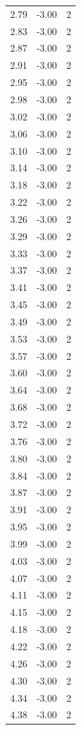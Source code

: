 \begin{longtable}{lrr}
  2.79 & -3.00 & 2 \\
  2.83 & -3.00 & 2 \\
  2.87 & -3.00 & 2 \\
  2.91 & -3.00 & 2 \\
  2.95 & -3.00 & 2 \\
  2.98 & -3.00 & 2 \\
  3.02 & -3.00 & 2 \\
  3.06 & -3.00 & 2 \\
  3.10 & -3.00 & 2 \\
  3.14 & -3.00 & 2 \\
  3.18 & -3.00 & 2 \\
  3.22 & -3.00 & 2 \\
  3.26 & -3.00 & 2 \\
  3.29 & -3.00 & 2 \\
  3.33 & -3.00 & 2 \\
  3.37 & -3.00 & 2 \\
  3.41 & -3.00 & 2 \\
  3.45 & -3.00 & 2 \\
  3.49 & -3.00 & 2 \\
  3.53 & -3.00 & 2 \\
  3.57 & -3.00 & 2 \\
  3.60 & -3.00 & 2 \\
  3.64 & -3.00 & 2 \\
  3.68 & -3.00 & 2 \\
  3.72 & -3.00 & 2 \\
  3.76 & -3.00 & 2 \\
  3.80 & -3.00 & 2 \\
  3.84 & -3.00 & 2 \\
  3.87 & -3.00 & 2 \\
  3.91 & -3.00 & 2 \\
  3.95 & -3.00 & 2 \\
  3.99 & -3.00 & 2 \\
  4.03 & -3.00 & 2 \\
  4.07 & -3.00 & 2 \\
  4.11 & -3.00 & 2 \\
  4.15 & -3.00 & 2 \\
  4.18 & -3.00 & 2 \\
  4.22 & -3.00 & 2 \\
  4.26 & -3.00 & 2 \\
  4.30 & -3.00 & 2 \\
  4.34 & -3.00 & 2 \\
  4.38 & -3.00 & 2 \\

\end{longtable}
